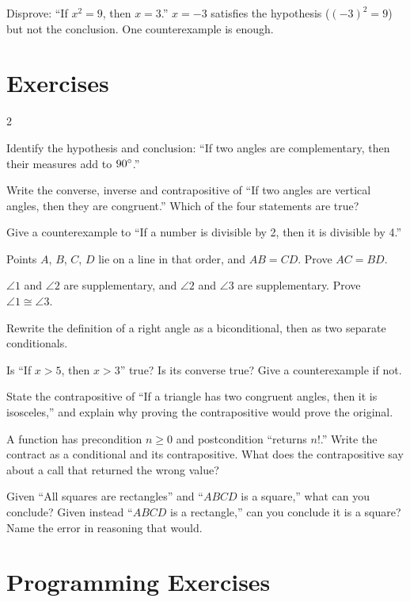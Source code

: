 \begin{example}
Disprove: ``If $x^2 = 9$, then $x = 3$.''
\solution $x = -3$ satisfies the hypothesis ($(-3)^2 = 9$) but not the conclusion. One counterexample is enough.
\end{example}

\section{Exercises}

\begin{multicols}{2}
\begin{exercises}
\item Identify the hypothesis and conclusion: ``If two angles are complementary, then their measures add to $90^\circ$.''
\item Write the converse, inverse and contrapositive of ``If two angles are vertical angles, then they are congruent.'' Which of the four statements are true?
\item Give a counterexample to ``If a number is divisible by 2, then it is divisible by 4.''
\item Points $A$, $B$, $C$, $D$ lie on a line in that order, and $AB = CD$. Prove $AC = BD$.
\item $\angle 1$ and $\angle 2$ are supplementary, and $\angle 2$ and $\angle 3$ are supplementary. Prove $\angle 1 \cong \angle 3$.
\item Rewrite the definition of a right angle as a biconditional, then as two separate conditionals.
\item Is ``If $x > 5$, then $x > 3$'' true? Is its converse true? Give a counterexample if not.
\item State the contrapositive of ``If a triangle has two congruent angles, then it is isosceles,'' and explain why proving the contrapositive would prove the original.
\item A function has precondition $n \ge 0$ and postcondition ``returns $n!$.'' Write the contract as a conditional and its contrapositive. What does the contrapositive say about a call that returned the wrong value?
\item Given ``All squares are rectangles'' and ``$ABCD$ is a square,'' what can you conclude? Given instead ``$ABCD$ is a rectangle,'' can you conclude it is a square? Name the error in reasoning that would.
\end{exercises}
\end{multicols}

\section{Programming Exercises}

